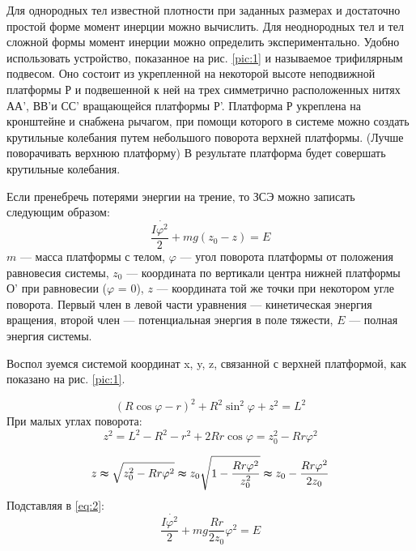 \documentclass[a4paper,12pt]{article} %
\begin{document}
Для однородных тел известной плотности при заданных размерах и достаточно простой форме момент инерции можно вычислить. Для неоднородных тел и тел сложной формы момент инерции можно определить экспериментально. Удобно использовать устройство, показанное на рис. \ref{pic:1} и называемое трифилярным подвесом. Оно состоит из укрепленной на некоторой высоте неподвижной платформы Р и подвешенной к ней на трех симметрично расположенных нитях АА’, ВВ'и СС' вращающейся платформы Р'.
Платформа Р укреплена на кронштейне и снабжена рычагом, при помощи которого в системе можно создать крутильные колебания путем небольшого поворота верхней платформы. (Лучше поворачивать верхнюю платформу)
В результате платформа будет совершать крутильные колебания.

Если пренебречь потерями энергии на трение, то ЗСЭ можно записать следующим образом:
\begin{equation}
  \frac{I \dot{\varphi^2}}{2} + mg(z_0 - z) = E \label{eq:2}
\end{equation}
$m$ — масса платформы с телом, $\varphi$ — угол поворота платформы от положения равновесия системы, $z_0$ — координата по вертикали центра нижней платформы О’ при равновесии ($\varphi$ = 0), $z$ — координата той же точки при некотором угле поворота. Первый член в левой части уравнения — кинетическая энергия вращения, второй член — потенциальная энергия в поле тяжести, $E$ — полная энергия системы.

Воспол зуемся системой координат x, y, z, связанной с верхней
платформой, как показано на рис. \ref{pic:1}.

\begin{equation}
  (R \cos{\varphi} - r)^2 + R^2\sin^2{\varphi} + z^2 = L^2 \label{eq:3}
\end{equation}
При малых углах поворота:
\begin{equation}
  z^2 = L^2 - R^2 - r^2 + 2Rr\cos{\varphi} = z_0^2 - Rr \varphi^2
  \label{eq:4}
\end{equation}

\begin{equation}
  z \thickapprox \sqrt{z_0^2 - Rr \varphi^2} \thickapprox z_0 \sqrt{1 - \frac{Rr\varphi^2}{z_0^2}} \thickapprox z_0 - \frac{Rr\varphi^2}{2z_0}
  \label{eq:5}
\end{equation}
Подставляя в \eqref{eq:2}:
\begin{equation}
  \frac{I\dot{\varphi^2}}{2} + mg \frac{Rr}{2z_0}\varphi^2 = E
  \label{eq:6}
\end{equation}
\end{document}
